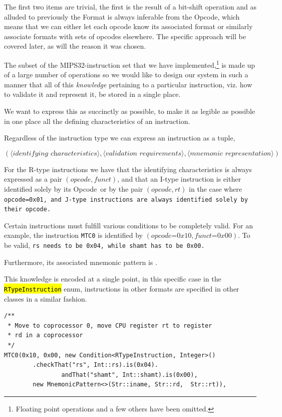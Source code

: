 \documentclass[a4paper]{article}
\newcommand{\opcode}{Opcode\ }
\newcommand{\hlc}[2][inlinecode]{{\sethlcolor{#1} \texttt{\hl{#2}}}}
\begin{document}
The first two items are trivial, the first is the result of a
bit-shift operation and as alluded to previously the Format is always
inferable from the Opcode, which means that we can either let each
opcode know its associated format or similarly associate formats
with sets of opcodes elsewhere. The specific approach will be covered
later, as will the reason it was chosen.

The subset of the MIPS32-instruction set that we have
implemented,\footnote{Floating point operations and a few others have
  been omitted.} is made up of a large number of operations so we would
like to design our system in such a manner that all of this
\emph{knowledge} pertaining to a particular instruction, viz. how to
validate it and represent it, be stored in a single place.

We want to express this as succinctly as possible, to make it as
legible as possible in one place all the defining characteristics
of an instruction.

Regardless of the instruction type we can express an instruction
as a tuple,

\begin{equation*}
(\langle \textit{identifying characteristics} \rangle, \langle
  \textit{validation requirements} \rangle, \langle \textit{mnemonic
    representation} \rangle)
\end{equation*}

For the R-type instructions we have that the identifying
characteristics is always expressed as a pair $(\textit{opcode},
\textit{funct})$, and that an I-type instruction is either identified
solely by its \opcode or by the pair $(\textit{opcode}, \textit{rt})$
in the case where \tt{opcode=0x01}, and J-type instructions are always
identified solely by their opcode.

Certain instructions must fulfill various conditions to be completely
valid. For an example, the instruction \texttt{MTC0} is identified by
$(\textit{opcode=0x10}, \textit{funct=0x00})$. To be valid, \tt{rs}
needs to be \tt{0x04}, while \tt{shamt} has to be \tt{0x00}.

Furthermore, its associated mnemonic pattern is .

This knowledge is encoded at a single point, in this specific case
in the \hlc{RTypeInstruction} enum, instructions in other formats are
specified in other classes in a similar fashion.

\begin{verbatim}
/**
 * Move to coprocessor 0, move CPU register rt to register
 * rd in a coprocessor
 */
MTC0(0x10, 0x00, new Condition<RTypeInstruction, Integer>()
        .checkThat("rs", Int::rs).is(0x04).
                andThat("shamt", Int::shamt).is(0x00),
        new MnemonicPattern<>(Str::iname, Str::rd,  Str::rt)),
\end{verbatim}
\end{document}
